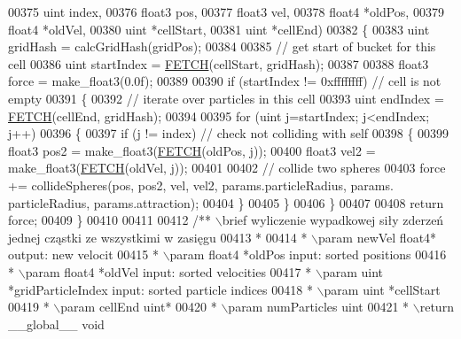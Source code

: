 \begin{DoxyCode}
00375                    uint    index,
00376                    float3  pos,
00377                    float3  vel,
00378                    float4 *oldPos,
00379                    float4 *oldVel,
00380                    uint   *cellStart,
00381                    uint   *cellEnd)
00382 \{
00383     uint gridHash = calcGridHash(gridPos);
00384 
00385     \textcolor{comment}{// get start of bucket for this cell}
00386     uint startIndex = \hyperlink{particles__kernel_8cuh_a12269d678a65f18889c2a7e98c756457}{FETCH}(cellStart, gridHash);
00387 
00388     float3 force = make\_float3(0.0f);
00389 
00390     \textcolor{keywordflow}{if} (startIndex != 0xffffffff)          \textcolor{comment}{// cell is not empty}
00391     \{
00392         \textcolor{comment}{// iterate over particles in this cell}
00393         uint endIndex = \hyperlink{particles__kernel_8cuh_a12269d678a65f18889c2a7e98c756457}{FETCH}(cellEnd, gridHash);
00394 
00395         \textcolor{keywordflow}{for} (uint j=startIndex; j<endIndex; j++)
00396         \{
00397             \textcolor{keywordflow}{if} (j != index)                \textcolor{comment}{// check not colliding with self}
00398             \{
00399                 float3 pos2 = make\_float3(\hyperlink{particles__kernel_8cuh_a12269d678a65f18889c2a7e98c756457}{FETCH}(oldPos, j));
00400                 float3 vel2 = make\_float3(\hyperlink{particles__kernel_8cuh_a12269d678a65f18889c2a7e98c756457}{FETCH}(oldVel, j));
00401 
00402                 \textcolor{comment}{// collide two spheres}
00403                 force += collideSpheres(pos, pos2, vel, vel2, params.particleRadius, params.
      particleRadius, params.attraction);
00404             \}
00405         \}
00406     \}
00407 
00408     \textcolor{keywordflow}{return} force;
00409 \}
00410 
00411 
00412 \textcolor{comment}{/** \(\backslash\)brief wyliczenie wypadkowej siły zderzeń jednej cząstki ze wszystkimi w zasięgu}
00413 \textcolor{comment}{ *}
00414 \textcolor{comment}{ * \(\backslash\)param newVel float4* output: new velocit}
00415 \textcolor{comment}{ * \(\backslash\)param float4 *oldPos input: sorted positions}
00416 \textcolor{comment}{ * \(\backslash\)param float4 *oldVel input: sorted velocities}
00417 \textcolor{comment}{ * \(\backslash\)param uint   *gridParticleIndex input: sorted particle indices}
00418 \textcolor{comment}{ * \(\backslash\)param uint   *cellStart}
00419 \textcolor{comment}{ * \(\backslash\)param cellEnd uint*}
00420 \textcolor{comment}{ * \(\backslash\)param numParticles uint}
00421 \textcolor{comment}{ * \(\backslash\)return \_\_global\_\_ void}

\end{DoxyCode}
